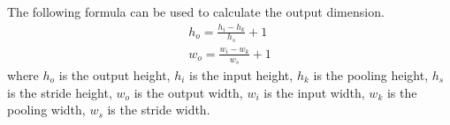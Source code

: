 The following formula can be used to calculate the output dimension.
\begin{gather}
  h_{o} = \frac{h_{i} - h_{k}}{h_{s}} + 1\\
  w_{o} = \frac{w_{i} - w_{k}}{w_{s}} + 1
\end{gather}
where \(h_{o}\) is the output height, \(h_{i}\) is the input height, \(h_{k}\) is the pooling height, \(h_{s}\) is the stride height, \(w_{o}\) is the output width, \(w_{i}\) is the input width, \(w_{k}\) is the pooling width, \(w_{s}\) is the stride width.



